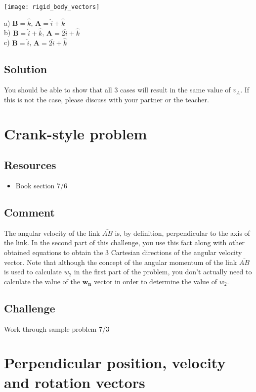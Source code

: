 \texttt{[image: rigid\_body\_vectors]}

a) $\bm{B} = \hat{k}$,              $\bm{A} = \hat{i} + \hat{k}$\\
b) $\bm{B} = \hat{i} + \hat{k}$,    $\bm{A} = 2 \hat{i} + \hat{k}$\\
c) $\bm{B} = \hat{i}$,              $\bm{A} = 2 \hat{i} + \hat{k}$

\subsection*{Solution}
You should be able to show that all 3 cases will result in the same value of $v_A$. If this is not the case, please discuss with your partner or the teacher.




\newpage
\section{Crank-style problem}

\subsection*{Resources}
\begin{itemize}
    \item Book section 7/6
\end{itemize}

\subsection*{Comment}
The angular velocity of the link $\bar{AB}$ is, by definition, perpendicular to the axis of the link. In the second part of this challenge, you use this fact along with other obtained equations to obtain the 3 Cartesian directions of the angular velocity vector. Note that although the concept of the angular momentum of the link $\bar{AB}$ is used to calculate $w_2$ in the first part of the problem, you don't actually need to calculate the value of the $\bm{w_n}$ vector in order to determine the value of $w_2$.

\subsection*{Challenge}
Work through sample problem 7/3




\newpage
\section{Perpendicular position, velocity and rotation vectors}

